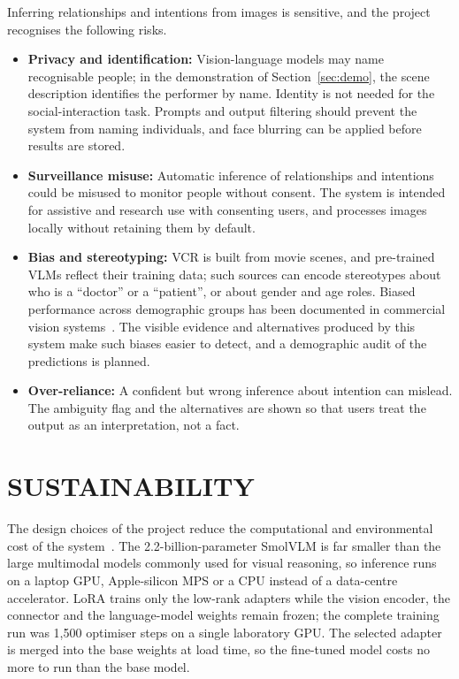 Inferring relationships and intentions from images is sensitive, and the project recognises the following risks.
\begin{itemize}
\item \textbf{Privacy and identification:} Vision-language models may name recognisable people; in the demonstration of Section~\ref{sec:demo}, the scene description identifies the performer by name. Identity is not needed for the social-interaction task. Prompts and output filtering should prevent the system from naming individuals, and face blurring can be applied before results are stored.
\item \textbf{Surveillance misuse:} Automatic inference of relationships and intentions could be misused to monitor people without consent. The system is intended for assistive and research use with consenting users, and processes images locally without retaining them by default.
\item \textbf{Bias and stereotyping:} VCR is built from movie scenes, and pre-trained VLMs reflect their training data; such sources can encode stereotypes about who is a ``doctor'' or a ``patient'', or about gender and age roles. Biased performance across demographic groups has been documented in commercial vision systems~\cite{buolamwini2018gender}. The visible evidence and alternatives produced by this system make such biases easier to detect, and a demographic audit of the predictions is planned.
\item \textbf{Over-reliance:} A confident but wrong inference about intention can mislead. The ambiguity flag and the alternatives are shown so that users treat the output as an interpretation, not a fact.
\end{itemize}

\section{SUSTAINABILITY}

The design choices of the project reduce the computational and environmental cost of the system~\cite{strubell2019energy}. The 2.2-billion-parameter SmolVLM is far smaller than the large multimodal models commonly used for visual reasoning, so inference runs on a laptop GPU, Apple-silicon MPS or a CPU instead of a data-centre accelerator. LoRA trains only the low-rank adapters while the vision encoder, the connector and the language-model weights remain frozen; the complete training run was 1,500 optimiser steps on a single laboratory GPU. The selected adapter is merged into the base weights at load time, so the fine-tuned model costs no more to run than the base model.

